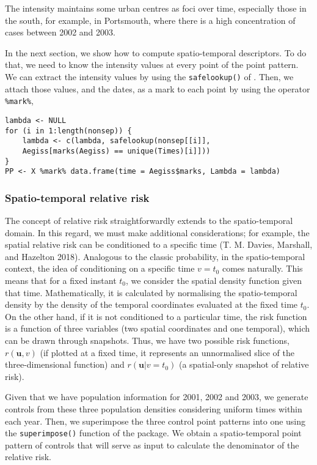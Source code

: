 The intensity maintains some urban centres as foci over time, especially those in the south, for example, in Portsmouth, where there is a high concentration of cases between 2002 and 2003.

In the next section, we show how to compute spatio-temporal descriptors. To do that, we need to know the intensity values at every point of the point pattern. We can extract the intensity values by using the \texttt{safelookup()} of . Then, we attach those values, and the dates, as a mark to each point by using the operator \texttt{\%mark\%},

\begin{verbatim}
lambda <- NULL
for (i in 1:length(nonsep)) {
    lambda <- c(lambda, safelookup(nonsep[[i]], 
    Aegiss[marks(Aegiss) == unique(Times)[i]]))
}
PP <- X %mark% data.frame(time = Aegiss$marks, Lambda = lambda)
\end{verbatim}

\hypertarget{spatio-temporal-relative-risk}{%
\subsubsection{Spatio-temporal relative risk}\label{spatio-temporal-relative-risk}}

The concept of relative risk straightforwardly extends to the spatio-temporal domain. In this regard, we must make additional considerations; for example, the spatial relative risk can be conditioned to a specific time (T. M. Davies, Marshall, and Hazelton 2018). Analogous to the classic probability, in the spatio-temporal context, the idea of conditioning on a specific time \(v=t_0\) comes naturally. This means that for a fixed instant \(t_0\), we consider the spatial density function given that time. Mathematically, it is calculated by normalising the spatio-temporal density by the density of the temporal coordinates evaluated at the fixed time \(t_0\). On the other hand, if it is not conditioned to a particular time, the risk function is a function of three variables (two spatial coordinates and one temporal), which can be drawn through snapshots. Thus, we have two possible risk functions, \(r(\mathbf{u},v)\) (if plotted at a fixed time, it represents an unnormalised slice of the three-dimensional function) and \(r(\mathbf{u}|v=t_0)\) (a spatial-only snapshot of relative risk).

Given that we have population information for 2001, 2002 and 2003, we generate controls from these three population densities considering uniform times within each year. Then, we superimpose the three control point patterns into one using the \texttt{superimpose()} function of the  package. We obtain a spatio-temporal point pattern of controls that will serve as input to calculate the denominator of the relative risk.

